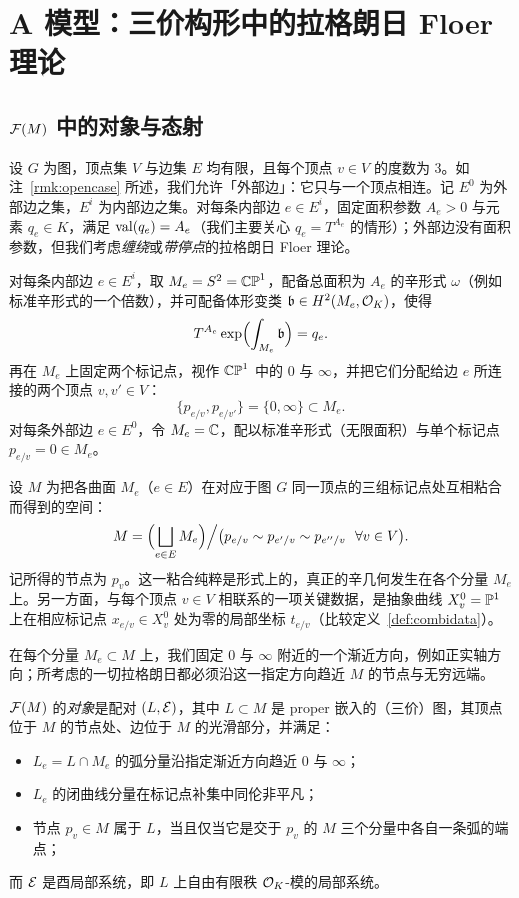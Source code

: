 \section{A 模型：三价构形中的拉格朗日 Floer 理论}\label{s:Amodel}

\subsection{$\mathcal{F}(M)$ 中的对象与态射}\label{ss:objects}

设 $G$ 为图，顶点集 $V$ 与边集 $E$ 均有限，且每个顶点 $v\in V$ 的度数为 $3$。如注~\ref{rmk:opencase} 所述，我们允许「外部边」：它只与一个顶点相连。记 $E^0$ 为外部边之集，$E^i$ 为内部边之集。对每条内部边 $e\in E^i$，固定面积参数 $A_e>0$ 与元素 $q_e\in K$，满足 $\operatorname{val}(q_e)=A_e$（我们主要关心 $q_e=T^{A_e}$ 的情形）；外部边没有面积参数，但我们考虑\emph{缠绕}或\emph{带停点}的拉格朗日 Floer 理论。

对每条内部边 $e\in E^i$，取 $M_e=S^2=\mathbb{CP}^1$，配备总面积为 $A_e$ 的辛形式 $\omega$（例如标准辛形式的一个倍数），并可配备体形变类 $\mathfrak{b}\in H^2(M_e,\mathcal{O}_K)$，使得
\[
T^{A_e}\exp\Bigl(\int_{M_e}\mathfrak{b}\Bigr)=q_e .
\]
再在 $M_e$ 上固定两个标记点，视作 $\mathbb{CP}^1$ 中的 $0$ 与 $\infty$，并把它们分配给边 $e$ 所连接的两个顶点 $v,v'\in V$：
\[
\{p_{e/v},p_{e/v'}\}=\{0,\infty\}\subset M_e .
\]
对每条外部边 $e\in E^0$，令 $M_e=\mathbb{C}$，配以标准辛形式（无限面积）与单个标记点 $p_{e/v}=0\in M_e$。

设 $M$ 为把各曲面 $M_e$（$e\in E$）在对应于图 $G$ 同一顶点的三组标记点处互相粘合而得到的空间：
\[
M=\Bigl(\bigsqcup_{e\in E}M_e\Bigr)\Big/\bigl(p_{e/v}\sim p_{e'/v}\sim p_{e''/v}\ \ \forall v\in V\bigr).
\]
记所得的节点为 $p_v$。这一粘合纯粹是形式上的，真正的辛几何发生在各个分量 $M_e$ 上。另一方面，与每个顶点 $v\in V$ 相联系的一项关键数据，是抽象曲线 $X^0_v=\mathbb{P}^1$ 上在相应标记点 $x_{e/v}\in X^0_v$ 处为零的局部坐标 $t_{e/v}$（比较定义~\ref{def:combidata}）。

在每个分量 $M_e\subset M$ 上，我们固定 $0$ 与 $\infty$ 附近的一个渐近方向，例如正实轴方向；所考虑的一切拉格朗日都必须沿这一指定方向趋近 $M$ 的节点与无穷远端。

\begin{defi}
$\mathcal{F}(M)$ 的\emph{对象}是配对 $(L,\mathcal{E})$，其中 $L\subset M$ 是 proper 嵌入的（三价）图，其顶点位于 $M$ 的节点处、边位于 $M$ 的光滑部分，并满足：
\begin{itemize}
\item $L_e=L\cap M_e$ 的弧分量沿指定渐近方向趋近 $0$ 与 $\infty$；
\item $L_e$ 的闭曲线分量在标记点补集中同伦非平凡；
\item 节点 $p_v\in M$ 属于 $L$，当且仅当它是交于 $p_v$ 的 $M$ 三个分量中各自一条弧的端点；
\end{itemize}
而 $\mathcal{E}$ 是酉局部系统，即 $L$ 上自由有限秩 $\mathcal{O}_K$-模的局部系统。
\end{defi}

